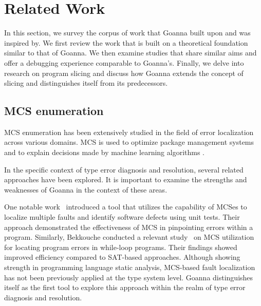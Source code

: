 \documentclass[pdflatex,lineno,sn-nature,Numbered]{sn-jnl}%
\begin{document}

\section{Related Work} 
    \label{sec:related-work}
    In this section, we survey the corpus of work that Goanna built upon and was inspired by. We first review the work that is built on a theoretical foundation similar to that of Goanna. We then examine studies that share similar aims and offer a debugging experience comparable to Goanna's. Finally, we delve into research on program slicing and discuss how Goanna extends the concept of slicing and distinguishes itself from its predecessors.

    \subsection{MCS enumeration}
	
    MCS enumeration has been extensively studied in the field of error localization across various domains. MCS is used to optimize package management systems \cite{Ignatiev2014-nr} and to explain decisions made by machine learning algorithms \cite{Marques-Silva2023-nk}.
    
    
    In the specific context of type error diagnosis and resolution, several related approaches have been explored. It is important to examine the strengths and weaknesses of Goanna in the context of these areas.

One notable work~\cite{Lamraoui2016-wr} introduced a tool that utilizes the capability of MCSes to localize multiple faults and identify software defects using unit tests. Their approach demonstrated the effectiveness of MCS in pinpointing errors within a program. Similarly, Bekkouche conducted a relevant study~\cite{Bekkouche2015-is}  on MCS utilization for locating program errors in while-loop programs. Their findings showed improved efficiency compared to SAT-based approaches. Although showing strength in programming language static analysis, MCS-based fault localization has not been previously applied at the type system level. Goanna distinguishes itself as the first tool to explore this approach within the realm of type error diagnosis and resolution.
    
\end{document}
